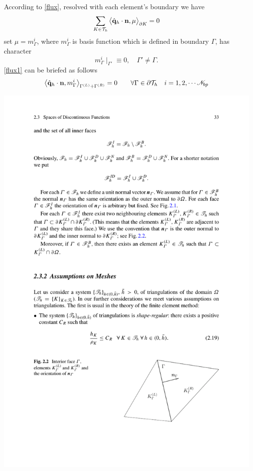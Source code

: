\documentclass[10pt,reqno, final]{amsart}
\begin{document}
According to \eqref{flux}, resolved with each element's boundary we have
\begin{equation}\label{flux1}
  \sum_{K \in \mathcal{T}_h}\big\langle\hat{\bf q}_h\cdot{\bf n}, \mu\big\rangle_{\partial K}=0
\end{equation}
set $\mu=m_{\Gamma}^i$, where $m_{\Gamma}^i$ is basis function which is defined in boundary $\Gamma$, has character
\begin{equation*}
  m_{\Gamma}^i \mid_{\Gamma'} \equiv 0,\quad  \Gamma' \neq \Gamma.
\end{equation*}
\eqref{flux1} can be briefed as follows
\begin{equation}\label{flux2}
  \big\langle\hat{\bf q}_h\cdot{\bf n}, m_{\Gamma}^i\big\rangle_{\Gamma^{(L)}+\Gamma^{(R)}}=0 \qquad \forall \Gamma \in \partial\mathcal{T}_h \quad i = 1, 2 , \cdots \mathscr N_{bp}
\end{equation}
\begin{center}
\includegraphics[totalheight=2in]{LR1}
\end{center}
\end{document}
